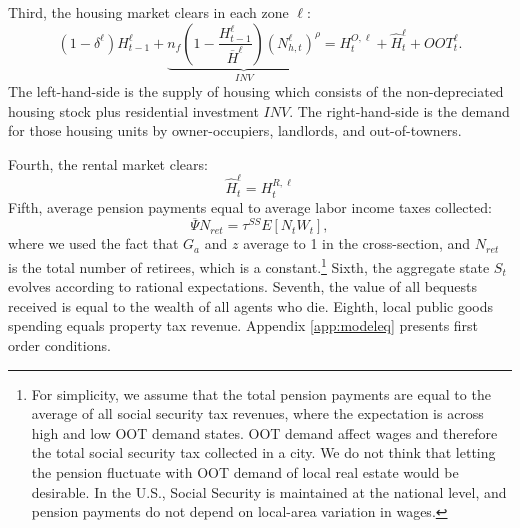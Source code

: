 \documentclass[letterpaper,12pt,dvipsnames,usenames]{article}
\theoremstyle{definition}
\begin{document}
\begin{spacing}{1.25}
Third, the housing market clears in each zone $\ell$:
\begin{equation}\label{Eq:MarketClearingHousing}
(1-\delta^{\ell})H^{\ell}_{t-1}+\underbrace{n_{f}\left(1-\frac{H^{\ell}_{t-1}}{\overline{H}^{\ell}}\right)\left(N^{\ell}_{h,t}\right)^{\rho}}_{INV}=H^{O,\ell}_{t}+\widehat{H}^{\ell}_{t}+OOT^{\ell}_{t}.
\end{equation}
The left-hand-side is the supply of housing which consists of the non-depreciated housing stock plus residential investment $INV$. The right-hand-side is the demand for those housing units by owner-occupiers, landlords, and out-of-towners.

Fourth, the rental market clears:
\begin{equation}
\widehat{H}^{\ell}_{t}=H^{R,\ell}_{t}
\end{equation}
Fifth, average pension payments equal to average labor income taxes collected:
\begin{equation}
\overline{\Psi}N_{ret}=\tau^{SS} E\left[N_{t}W_{t}\right],\label{eq:ss}
\end{equation}
where we used the fact that $G_a$ and $z$ average to 1 in the cross-section, and $N_{ret}$ is the total number of retirees, which is a constant.\footnote{For simplicity, we assume that the total pension payments are equal to the average of all social security tax revenues, where the expectation is across high and low OOT demand states. OOT demand affect wages and therefore the total social security tax collected in a city. We do not think that letting the pension fluctuate with OOT demand of local real estate would be desirable. In the U.S., Social Security is maintained at the national level, and pension payments do not depend on local-area variation in wages.}
Sixth, the aggregate state $S_{t}$ evolves according to rational expectations.
Seventh, the value of all bequests received is equal to the wealth of all agents who die. Eighth, local public goods spending equals property tax revenue. Appendix \ref{app:modeleq} presents first order conditions.



\end{spacing}
\end{document}
